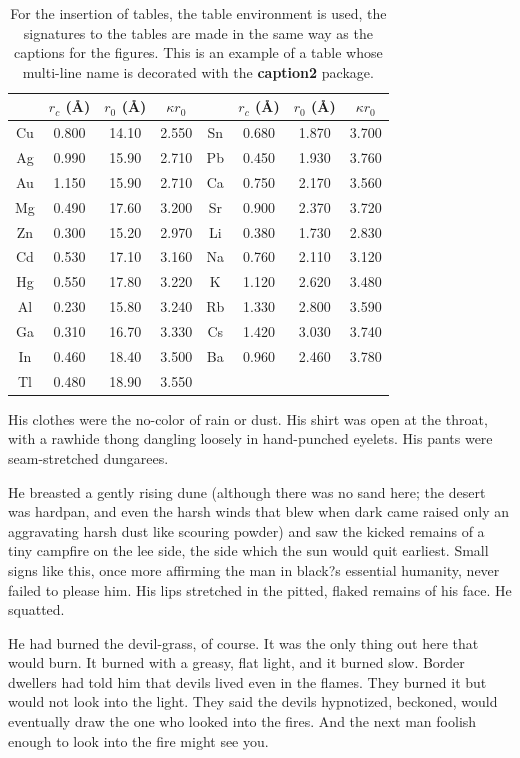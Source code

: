 \documentclass[
11pt,%
tightenlines,%
twoside,%
onecolumn,%
nofloats,%
nobibnotes,%
nofootinbib,%
superscriptaddress,%
noshowpacs,%
centertags]%
{revtex4}
\begin{document}
\begin{table}[!h]
\setcaptionmargin{0mm}
\onelinecaptionsfalse
{}
\caption{ For the insertion of tables, the table environment is used,
 the signatures to the tables are made in the same way as the captions
 for the figures. This is an example of a table whose multi-line name
 is decorated with the \textbf{caption2} package.}
\bigskip
\begin{tabular}{|c|c|c|c|c|c|c|c|}
\hline
 &$r_c$ (\AA)&$r_0$ (\AA)&$\kappa r_0$&
 &$r_c$ (\AA) &$r_0$ (\AA)&$\kappa r_0$\\
\hline
Cu& 0.800 & 14.10 & 2.550 &Sn
& 0.680 & 1.870 & 3.700 \\
Ag& 0.990 & 15.90 & 2.710 &Pb
& 0.450 & 1.930 & 3.760 \\
Au& 1.150 & 15.90 & 2.710 &Ca
& 0.750 & 2.170 & 3.560 \\
Mg& 0.490 & 17.60 & 3.200 &Sr
& 0.900 & 2.370 & 3.720 \\
Zn& 0.300 & 15.20 & 2.970 &Li
& 0.380 & 1.730 & 2.830 \\
Cd& 0.530 & 17.10 & 3.160 &Na
& 0.760 & 2.110 & 3.120 \\
Hg& 0.550 & 17.80 & 3.220 &K &  1.120 & 2.620 & 3.480 \\
Al& 0.230 & 15.80 & 3.240 &Rb & 1.330 & 2.800 & 3.590 \\
Ga& 0.310 & 16.70 & 3.330 &Cs & 1.420 & 3.030 & 3.740 \\
In& 0.460 & 18.40 & 3.500 &Ba & 0.960 & 2.460 & 3.780 \\
Tl& 0.480 & 18.90 & 3.550 & & & & \\[1mm]
\hline
\end{tabular}
\end{table}

His clothes were the no-color of rain or dust. His shirt was open at the throat, with a rawhide thong dangling loosely in hand-punched eyelets. His pants were seam-stretched dungarees.

He breasted a gently rising dune (although there was no sand here; the desert was hardpan, and even the harsh winds that blew when dark came raised only an aggravating harsh dust like scouring powder) and saw the kicked remains of a tiny campfire on the lee side, the side which the sun would quit earliest. Small signs like this, once more affirming the man in black?s essential humanity, never failed to please him. His lips stretched in the pitted, flaked remains of his face. He squatted.

He had burned the devil-grass, of course. It was the only thing out here that would burn. It burned with a greasy, flat light, and it burned slow. Border dwellers had told him that devils lived even in the flames. They burned it but would not look into the light. They said the devils hypnotized, beckoned, would eventually draw the one who looked into the fires. And the next man foolish enough to look into the fire might see you.
\end{document}
